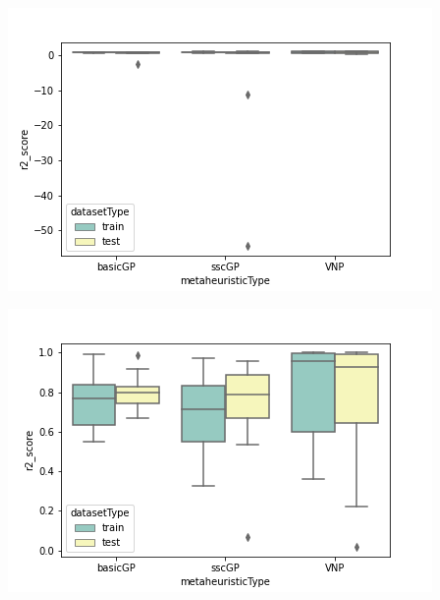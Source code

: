 \documentclass[main.tex]{subfiles}
\begin{document}
\begin{figure}
\centering
\begin{minipage}{.5\textwidth}
  \centering
  \includegraphics[width=1.1\linewidth]{../images/f3.png}
  \label{fig:f3}
\end{minipage}%
\begin{minipage}{.5\textwidth}
  \centering
  \includegraphics[width=1.1\linewidth]{../images/f4.png}
  \label{fig:f4}
\end{minipage}
\end{figure}
\end{document}
